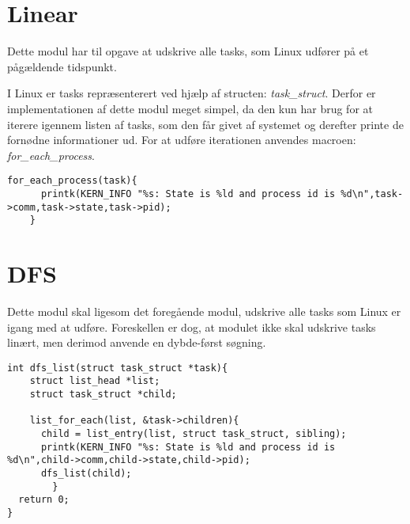 \section{Linear}
Dette modul har til opgave at udskrive alle tasks, som Linux udfører på et pågældende tidspunkt. 

I Linux er tasks repræsenterert ved hjælp af structen: \textit{task\_struct}. Derfor er implementationen af dette modul meget simpel, da den kun har brug for at iterere igennem listen af tasks, som den får givet af systemet og derefter printe de fornødne informationer ud. For at udføre iterationen anvendes macroen: \textit{for\_each\_process}.

\begin{lstlisting}
for_each_process(task){
	  printk(KERN_INFO "%s: State is %ld and process id is %d\n",task->comm,task->state,task->pid);
	}
\end{lstlisting}

\section{DFS}
Dette modul skal ligesom det foregående modul, udskrive alle tasks som Linux er igang med at udføre. Foreskellen er dog, at modulet ikke skal udskrive tasks linært, men derimod anvende en dybde-først søgning.
\\
\begin{lstlisting}
int dfs_list(struct task_struct *task){
	struct list_head *list;	  
	struct task_struct *child;

  	list_for_each(list, &task->children){
	  child = list_entry(list, struct task_struct, sibling);	
	  printk(KERN_INFO "%s: State is %ld and process id is %d\n",child->comm,child->state,child->pid);
	  dfs_list(child);
        }
  return 0;
}
\end{lstlisting}